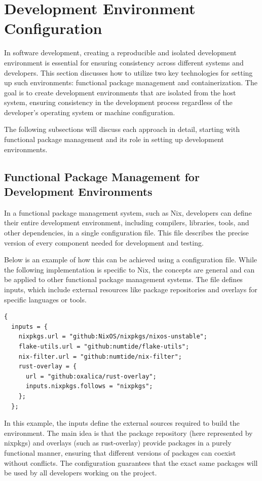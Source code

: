 \section{Development Environment Configuration}

In software development, creating a reproducible and isolated development
environment is essential for ensuring consistency across different systems
and developers. This section discusses how to utilize two key technologies for
setting up such environments: functional package management and containerization.
The goal is to create development environments that are isolated from the host
system, ensuring consistency in the development process regardless of the
developer's operating system or machine configuration.

The following subsections will discuss each approach in detail, starting with
functional package management and its role in setting up development environments.

\subsection{Functional Package Management for Development Environments}

In a functional package management system, such as Nix, developers can define their
entire development environment, including compilers, libraries, tools, and other
dependencies, in a single configuration file. This file describes the precise
version of every component needed for development and testing.

Below is an example of how this can be achieved using a configuration file. While
the following implementation is specific to Nix, the concepts are general and can
be applied to other functional package management systems. The file defines inputs,
which include external resources like package repositories and overlays for specific
languages or tools.

\begin{lstlisting}[caption={Input section for functional package management}]
{
  inputs = {
    nixpkgs.url = "github:NixOS/nixpkgs/nixos-unstable";
    flake-utils.url = "github:numtide/flake-utils";
    nix-filter.url = "github:numtide/nix-filter";
    rust-overlay = {
      url = "github:oxalica/rust-overlay";
      inputs.nixpkgs.follows = "nixpkgs";
    };
  };
\end{lstlisting}

In this example, the inputs define the external sources required to build the
environment. The main idea is that the package repository (here represented by
nixpkgs) and overlays (such as rust-overlay) provide packages in a purely
functional manner, ensuring that different versions of packages can coexist without
conflicts. The configuration guarantees that the exact same packages will be
used by all developers working on the project.

